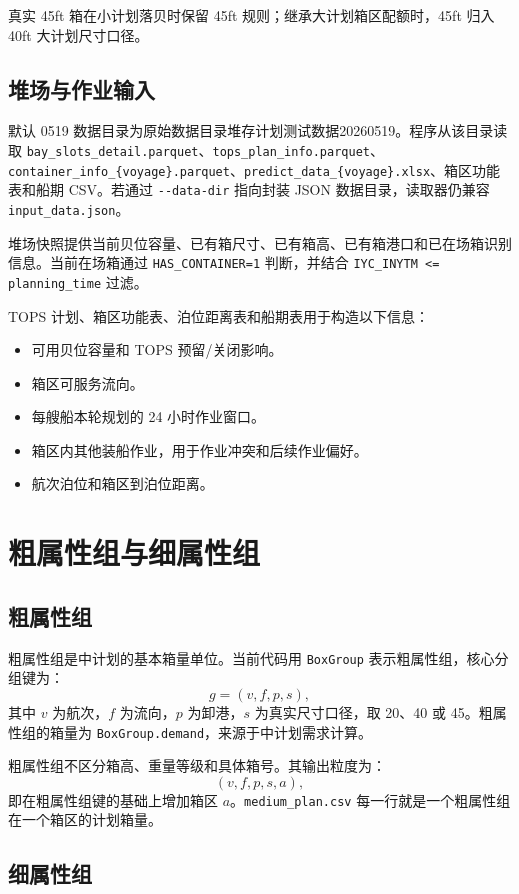 \documentclass[UTF8,a4paper,11pt]{ctexart}
\newcommand{\code}[1]{\nolinkurl{#1}}
\begin{document}
真实 45ft 箱在小计划落贝时保留 45ft 规则；继承大计划箱区配额时，45ft 归入 40ft 大计划尺寸口径。

\subsection{堆场与作业输入}

默认 0519 数据目录为原始数据目录堆存计划测试数据20260519。程序从该目录读取 \code{bay_slots_detail.parquet}、\code{tops_plan_info.parquet}、\code{container_info_\{voyage\}.parquet}、\code{predict_data_\{voyage\}.xlsx}、箱区功能表和船期 CSV。若通过 \code{--data-dir} 指向封装 JSON 数据目录，读取器仍兼容 \code{input_data.json}。

堆场快照提供当前贝位容量、已有箱尺寸、已有箱高、已有箱港口和已在场箱识别信息。当前在场箱通过 \code{HAS_CONTAINER=1} 判断，并结合 \code{IYC_INYTM <= planning_time} 过滤。

TOPS 计划、箱区功能表、泊位距离表和船期表用于构造以下信息：
\begin{itemize}
  \item 可用贝位容量和 TOPS 预留/关闭影响。
  \item 箱区可服务流向。
  \item 每艘船本轮规划的 24 小时作业窗口。
  \item 箱区内其他装船作业，用于作业冲突和后续作业偏好。
  \item 航次泊位和箱区到泊位距离。
\end{itemize}

\section{粗属性组与细属性组}

\subsection{粗属性组}

粗属性组是中计划的基本箱量单位。当前代码用 \code{BoxGroup} 表示粗属性组，核心分组键为：
\[
g=(v,f,p,s),
\]
其中 \(v\) 为航次，\(f\) 为流向，\(p\) 为卸港，\(s\) 为真实尺寸口径，取 20、40 或 45。粗属性组的箱量为 \code{BoxGroup.demand}，来源于中计划需求计算。

粗属性组不区分箱高、重量等级和具体箱号。其输出粒度为：
\[
(v,f,p,s,a),
\]
即在粗属性组键的基础上增加箱区 \(a\)。\code{medium_plan.csv} 每一行就是一个粗属性组在一个箱区的计划箱量。

\subsection{细属性组}
\end{document}

